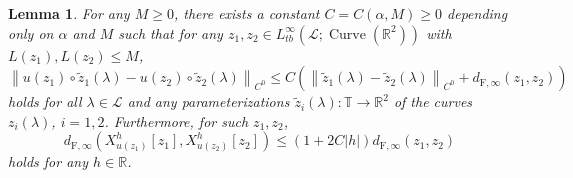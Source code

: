 \documentclass[reqno,centertags,12pt]{amsart}
\newtheorem{lemma}[theorem]{Lemma}
\theoremstyle{definition}
\numberwithin{equation}{section}
\newcommand{\abs}[1]{\left\lvert#1\right\rvert}
\newcommand{\norm}[1]{\left\|#1\right\|}
\newcommand{\bbR}{{\mathbb{R}}}
\newcommand{\bbT}{{\mathbb{T}}}
\begin{document}
\begin{lemma}\label{L5.2}
    For any $M\geq 0$, there exists a constant $C=C(\alpha,M)\geq 0$
    depending only on $\alpha$ and $M$ such that for any
    $z_{1},z_{2}\in L_{tb}^{\infty}(\mathcal{L};\operatorname{Curve}(\bbR^{2}))$
    with $L(z_{1}),L(z_{2}) \leq M$,
    \[
        \norm{u(z_{1})\circ\tilde{z}_{1}(\lambda)
        - u(z_{2})\circ\tilde{z}_{2}(\lambda)}_{C^{0}}
        \leq C
        \left(
            \norm{\tilde{z}_{1}(\lambda) - \tilde{z}_{2}(\lambda)}_{C^{0}}
            + d_{\mathrm{F},\infty}(z_{1},z_{2})
        \right)
    \]
    holds for all $\lambda\in\mathcal{L}$ and any parameterizations
    $\tilde{z}_{i}(\lambda)\colon\bbT\to\bbR^{2}$ of the curves
    $z_{i}(\lambda)$, $i=1,2$. Furthermore, for such $z_{1},z_{2}$,
    \[
        d_{\mathrm{F},\infty}\left(
            X_{u(z_{1})}^{h}[z_{1}],
            X_{u(z_{2})}^{h}[z_{2}]
        \right) \leq (1+2C\abs{h})d_{\mathrm{F},\infty}(z_{1},z_{2})
    \]
    holds for any $h\in\bbR$.
\end{lemma}
\end{document}
